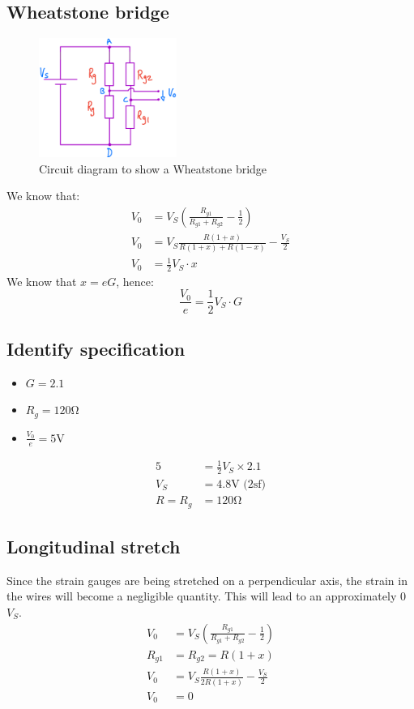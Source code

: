 \documentclass[12pt]{article}
\numberwithin{equation}{section}
\begin{document}
\subsection*{Wheatstone bridge}
\begin{figure}[H]
  \centering
  \includegraphics[width=0.4\textwidth]{./img/4-1circuit.png}
  \caption{Circuit diagram to show a Wheatstone bridge}
\end{figure}
We know that:
\begin{align}
  V_0 &= V_S \left( \frac{R_{g1}}{R_{g1} + R_{g2}} - \frac{1}{2} \right)\\
  V_0 &= V_S \frac{R(1+x)}{R(1+x) + R(1-x)} - \frac{V_S}{2}\\
  V_0 &= \frac{1}{2} V_S \cdot x
\end{align}
We know that $x = eG$, hence:
\begin{equation}
  \frac{V_0}{e} = \frac{1}{2}V_S \cdot G
\end{equation}
\subsection*{Identify specification}
\begin{itemize}
  \item $G = 2.1$
  \item $R_g = 120\si{\ohm}$
  \item $\frac{V_0}{e} = 5\si{\volt}$
\end{itemize}
\begin{align}
  5 &= \frac{1}{2} V_S \times 2.1\\
  V_S &= 4.8 \si{\volt} \textrm{ (2sf)}\\
  R = R_g &= 120\si{\ohm}
\end{align}
\subsection*{Longitudinal stretch}
Since the strain gauges are being stretched on a perpendicular axis, the strain in the wires will become a negligible quantity. This will lead to an approximately 0 $V_S$. 
\begin{align}
  V_0 &= V_S \left( \frac{R_{g1}}{R_{g1} + R_{g2}} - \frac{1}{2} \right)\\
  R_{g1} &= R_{g2} = R(1+x)\\
  V_0 &= V_S\frac{R(1+x)}{2R(1+x)} - \frac{V_S}{2}\\
  V_0 &= 0 
\end{align}
\end{document}
